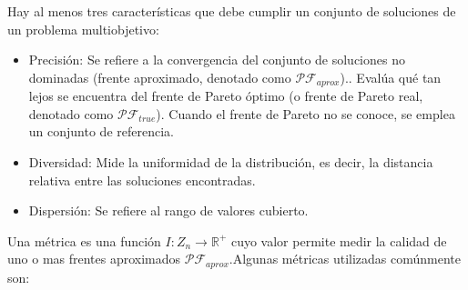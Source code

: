 \documentclass[letterpaper,10pt]{article}
\begin{document}
Hay al menos tres características que debe cumplir un conjunto de soluciones de un problema multiobjetivo:

\begin{itemize}
 \item Precisión: Se refiere a la convergencia del conjunto de soluciones no dominadas (frente aproximado, denotado como $\mathcal{PF}_{aprox}$).. Evalúa qué tan lejos se encuentra del
frente de Pareto óptimo (o frente de Pareto real, denotado como $\mathcal{PF}_{true}$). Cuando el frente de Pareto no se conoce, se emplea un conjunto de referencia.

 \item Diversidad: Mide la uniformidad de la distribución, es decir, la distancia relativa entre las soluciones encontradas.

 \item Dispersión: Se refiere al rango de valores cubierto.
 
\end{itemize}

Una métrica es una función $I:Z_n \rightarrow \mathbb{R}^+$ cuyo valor permite medir la calidad de uno o mas frentes aproximados $\mathcal{PF}_{aprox}$.Algunas métricas utilizadas comúnmente son:
\end{document}
